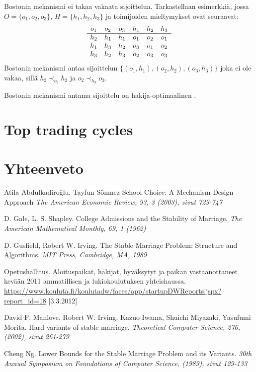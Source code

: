 \documentclass[gradu, twoside]{tktltiki}
\begin{document}
Bostonin mekanismi ei takaa vakaata sijoittelua. Tarkastellaan
esimerkkiä, jossa $O = \{o_1, o_2, o_3\}$, $H = \{h_1, h_2, h_3\}$ ja
toimijoiden mieltymykset ovat seuraavat:
\[
  \begin{array}{c c c}
    o_1 & o_2 & o_3 \\
    \hline
    h_2 & h_1 & h_1 \\
    h_1 & h_3 & h_2 \\
    h_3 & h_2 & h_3
  \end{array}
  \begin{array}{|c c c}
    h_1 & h_2 & h_3 \\
    \hline
    o_1 & o_2 & o_1 \\
    o_3 & o_1 & o_2 \\
    o_2 & o_3 & o_3
  \end{array}
\]
Bostonin mekanismi antaa sijoittelun $\{(o_1, h_1), (o_2, h_2), (o_3,
h_3)\}$ joka ei ole vakaa, sillä $h_3 \prec_{o_2} h_2$ ja $o_2
\prec_{h_3} o_3$.

Bostonin mekanismi antama sijoittelu on hakija-optimaalinen \cite{?}.

\section{Top trading cycles}

\section{Yhteenveto}

\newpage
\begin{thebibliography}{XXX99}

  Atila Abdulkadiroğlu, Tayfun Sönmez
  School Choice: A Mechanism Design Approach
  \emph{The American Economic Review, 93, 3 (2003), sivut 729-747}

  D. Gale, L. S. Shapley.
  College Admissions and the Stability of Marriage.
  \emph{The American Mathematical Monthly, 69, 1 (1962)}

  D. Gusfield, Robert W. Irving.
  The Stable Marriage Problem: Structure and Algorithms.
  \emph{MIT Press, Cambridge, MA, 1989}

  Opetushallitus.
  Aloituspaikat, hakijat, hyväksytyt ja paikan vastaanottaneet
  kevään 2011 ammatillisen ja lukiokoulutuksen yhteishaussa.
  \url{https://www.kouluta.fi/koulutadw/faces/app/startupDWReports.jspx?report_id=18}
      [3.3.2012]

  David F. Manlove, Robert W. Irving, Kazuo Iwama, Shuichi Miyazaki,
  Yasufumi Morita.
  Hard variants of stable marriage.
  \emph{Theoretical Computer Science, 276, (2002), sivut 261-279}

  Cheng Ng.
  Lower Bounds for the Stable Marriage Problem and its Variants.
  \emph{30th Annual Symposium on Foundations of Computer Science,
    (1989), sivut 129-133}

\end{thebibliography}
\end{document}
